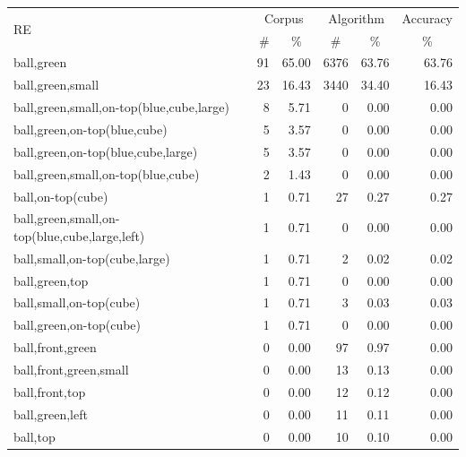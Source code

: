 \begin{table}[h!]
\begin{center}
\begin{tabular}{|l|r|r|r|r|r|}
\hline
\multirow{2}{*}{RE} & \multicolumn{2}{|c|}{Corpus} & \multicolumn{2}{|c|}{Algorithm} & Accuracy \\ \cline{2-6} 
 & \# & \multicolumn{1}{|c|}{\%} & \multicolumn{1}{|c|}{\#} & \multicolumn{1}{|c|}{\%} & \multicolumn{1}{|c|}{\%} \\
\hline
ball,green                                    & 91 & 65.00 & 6376 & 63.76 & 63.76 \\
ball,green,small                              & 23 & 16.43 & 3440 & 34.40 & 16.43 \\
ball,green,small,on-top(blue,cube,large)      &  8 &  5.71 &    0 &  0.00 &  0.00\\
ball,green,on-top(blue,cube)                  &  5 &  3.57 &    0 &  0.00 &  0.00\\
ball,green,on-top(blue,cube,large)            &  5 &  3.57 &    0 &  0.00 &  0.00\\
ball,green,small,on-top(blue,cube)            &  2 &  1.43 &    0 &  0.00 &  0.00\\
ball,on-top(cube)                             &  1 &  0.71 &   27 &  0.27 &  0.27 \\
ball,green,small,on-top(blue,cube,large,left) &  1 &  0.71 &    0 &  0.00 &  0.00\\
ball,small,on-top(cube,large)	              &  1 &  0.71 &    2 &  0.02 &  0.02 \\
ball,green,top                                &  1 &  0.71 &    0 &  0.00 &  0.00\\
ball,small,on-top(cube)                       &  1 &  0.71 &    3 &  0.03 &  0.03 \\
ball,green,on-top(cube)                       &  1 &  0.71 &    0 &  0.00 &  0.00\\
ball,front,green                              &  0 &  0.00 &   97 &  0.97 &  0.00\\
ball,front,green,small                        &  0 &  0.00 &   13 &  0.13 &  0.00\\
ball,front,top                                &  0 &  0.00 &   12 &  0.12 &  0.00\\
ball,green,left	                              &  0 &  0.00 &   11 &  0.11 &  0.00\\
ball,top                                      &  0 &  0.00 &   10 &  0.10 &  0.00\\

\end{tabular}
\end{center}
\end{table}
